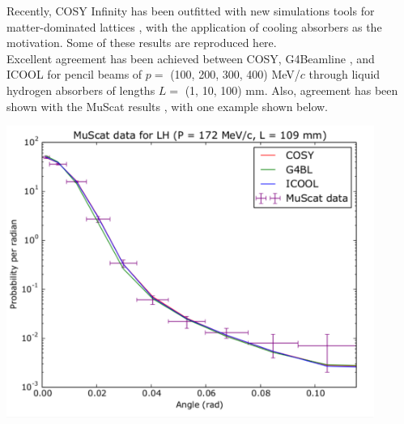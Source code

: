 \documentclass[portrait,a0paper,fontscale=0.285]{baposter} %
\begin{document}
\begin{poster}
{

Recently, COSY Infinity \cite{cosy} has been outfitted with new simulations tools for matter-dominated lattices \cite{ipac2015}, with the application of cooling absorbers as the motivation. Some of these results are reproduced here.
\\

Excellent agreement has been achieved between COSY, G4Beamline \cite{g4bl}, and ICOOL \cite{icool} for pencil beams of $p=$ (100, 200, 300, 400) MeV/$c$ through liquid hydrogen absorbers of lengths $L =$ (1, 10, 100) mm. Also, agreement has been shown with the MuScat results \cite{muscat}, with one example shown below.
\begin{center}
\includegraphics[width=0.9\textwidth]{Figures/Figure2poster}
\end{center}
}



\end{poster}
\end{document}
